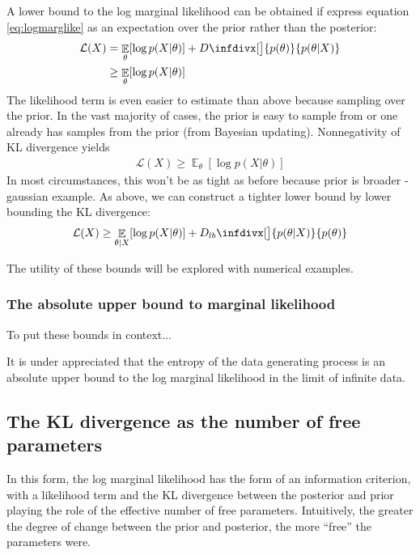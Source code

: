 \documentclass[10pt,a4paper]{article}
\DeclareMathOperator{\EX}{\mathbb{E}}%
\newcommand{\infdiv}{D\infdivx}
\newcommand{\infdivlb}{D_{lb}\infdivx}
\begin{document}
A lower bound to the log marginal likelihood can be obtained if express equation \ref{eq:logmarglike} as an expectation over the prior rather than the posterior:
\begin{align}
\mathcal{L}(X) &= \EX_{\theta} [ \log  p(X|\theta)] + \infdiv[\big]{p(\theta)}{ p(\theta|X)} \notag\\
&\geq  \EX_{\theta} [ \log  p(X|\theta)] 
\end{align}
The likelihood term is even easier to estimate than above because sampling over the prior. In the vast majority of cases, the prior is easy to sample from or one already has samples from the prior (from Bayesian updating). Nonnegativity of KL divergence yields
\begin{align}
\mathcal{L}(X) \geq \EX_{\theta } [ \log  p(X|\theta)] 
\end{align}
In most circumstances, this won't be as tight as before because prior is broader - gaussian example. As above, we can construct a tighter lower bound by lower bounding the KL divergence:
\begin{align}
\mathcal{L}(X) \geq \EX_{\theta | X} [ \log  p(X|\theta)] + \infdivlb[\big]{p(\theta | X)}{p(\theta)}
\end{align}

The utility of these bounds will be explored with numerical examples.
\subsubsection{The absolute upper bound to marginal likelihood}
To put these bounds in context...

It is under appreciated that the entropy of the data generating process is an absolute upper bound to the log marginal likelihood in the limit of infinite data. 
\subsection{The KL divergence as the number of free parameters}
In this form, the log marginal likelihood has the form of an information criterion, with a likelihood term and the KL divergence between the posterior and prior playing the role of the effective number of free parameters. Intuitively, the greater the degree of change between the prior and posterior, the more ``free'' the parameters were. 
\end{document}

